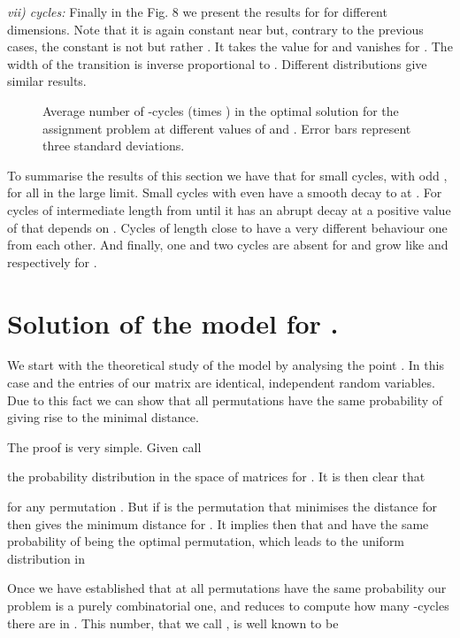 \documentclass[]{iopart}
\begin{document}
{\it vii)  cycles:}
Finally in the Fig. 8 we present the results for  for different 
dimensions.
Note that it is again constant near 
but, contrary to the previous cases, the constant is not  but rather
. It takes the value 
 for  and vanishes for . The width 
of the transition is inverse proportional to . Different distributions 
give similar results. 
\begin{figure}[h!]
\caption{\small Average number of -cycles (times ) in the
 optimal solution for
  the assignment problem at different values of  and  .
  Error bars represent three standard deviations.}
\label{pn}
\end{figure}


To summarise the results of this section
we have that for small cycles,
with odd ,
 for all  in the large  limit.
Small cycles with even  have a smooth decay to  at . 
For cycles of intermediate length 
 from  until it has an abrupt 
decay at a positive value of 
that depends on . 
Cycles of length close to  have a very different behaviour
one from each other. 
And finally, one and two
cycles are absent for  and grow
like  and  respectively for .


\section{Solution of the model for .}

We start with the theoretical study of the model
by analysing the point . In this case
 and the entries of our matrix
are identical, independent random variables.
Due to this fact we can show that all permutations  
have the same probability of giving rise to the minimal 
distance. 

The proof is very simple.
Given  call 
 
the probability distribution in the space of matrices
for .
It is then clear that

for any permutation .
But if  is the permutation that minimises
the distance  for  then
 gives the minimum distance for
. It implies then that  and 
have the same probability of being the optimal permutation,
which leads to the uniform distribution in 


Once we have established that at 
all permutations have the same probability
our problem is a purely combinatorial one,
and reduces to compute how many -cycles
there are in . This number, that we call , 
is well known to be 
\end{document}
